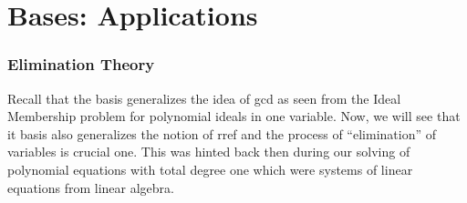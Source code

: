 \documentclass[a4paper,11pt]{article}
\begin{document}
\part{\Grob Bases: Applications}
\section{Elimination Theory}{\label{sec:eliminationtheory}}
Recall that the \Grob basis  generalizes the idea of gcd as seen from the Ideal Membership problem for  polynomial ideals in one variable.
Now, we will see that it \Grob basis also generalizes the notion of rref and the process of ``elimination'' of variables is crucial one. This was hinted back then during our solving of polynomial equations with total degree one which were systems of linear equations from linear algebra.
\end{document}
